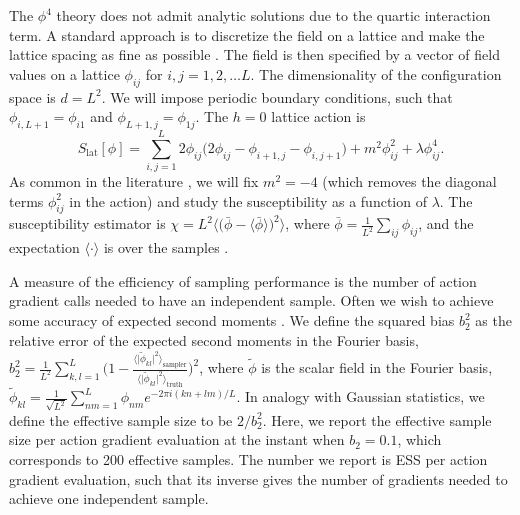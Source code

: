 \documentclass[tablecaption=bottom,wcp]{jmlr} %
\begin{document}
The $\phi^4$ theory does not admit analytic solutions due to the quartic interaction term. A standard approach is to discretize the field on a lattice and make the lattice spacing as fine as possible \citep{LQCDGattringer}. The field is then specified by a vector of field values on a lattice $\phi_{i j}$ for $i, j = 1, 2, \ldots L$. The dimensionality of the configuration space is $d = L^2$. We will impose periodic boundary conditions, such that $\phi_{i, L+1} = \phi_{i 1}$ and $\phi_{L+1, j} = \phi_{1 j}$. The $h = 0$ lattice action is \citep{phi4masterthesis}
\begin{equation} 
    S_{\mathrm{lat}}[\phi] = \sum_{i, j= 1}^L 2 \phi_{ij} \big(2 \phi_{i j} - \phi_{i+1, j} - \phi_{i, j+1}\big) + m^2 \phi_{i j}^2  + \lambda \phi_{i j}^4.
\end{equation}
As common in the literature \citep{rezende, phi4notebook, gerdes}, we will fix $m^2 = -4$ (which removes the diagonal terms $\phi_{ij}^2$ in the action) and study the susceptibility as a function of $\lambda$.
The susceptibility estimator is 
 $   \chi = L^2 \langle \big( \bar{\phi} - \langle \bar{\phi} \rangle\big)^2\rangle$, where
 $ \bar{\phi} = \frac{1}{L^2} \sum_{i j} \phi_{i j}$,
and the expectation $\langle \cdot \rangle$ is over the samples \citep{gerdes}.


A measure of the efficiency of sampling performance is the number of action gradient calls needed to 
have an independent sample. Often we wish to achieve some accuracy of expected second moments \citep{MCHMC}. We define the squared bias $b_2^2$ as the relative error of the expected second moments in the Fourier basis,
 $   b_2^2 = \frac{1}{L^2} \sum_{k, l = 1}^L \big( 1-\frac{\langle \vert \widetilde{\phi}_{k l} \vert^2 \rangle_{\text{sampler}}}{\langle \vert \widetilde{\phi}_{k l} \vert^2 \rangle_{\text{truth}}}\big)^2$,
where $\widetilde{\phi}$ is the scalar field in the Fourier basis,
 $   \widetilde{\phi}_{k l}= \frac{1}{\sqrt{L^2}}\sum_{n m = 1}^L \phi_{n m} e^{-2 \pi i (k n + l m) / L}$.
In analogy with Gaussian statistics, we define the effective sample size to be $2/b_2^2$. Here, we report the effective sample size per action gradient evaluation at the instant when $b_2 = 0.1$, which corresponds to 200 effective samples. The number we report is ESS per action gradient evaluation, such that its inverse gives the number of gradients needed to achieve one independent sample. 
\end{document}
